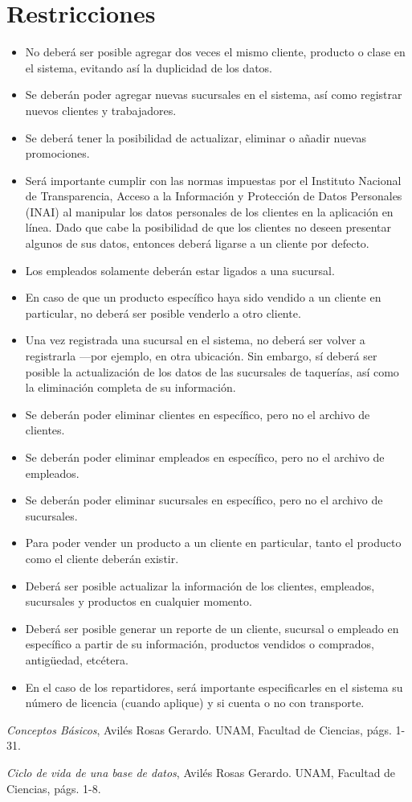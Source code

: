 \documentclass[11pt,letterpaper]{article}
\begin{document}
\section{Restricciones}
\begin{itemize}

\item No deberá ser posible agregar dos veces el mismo cliente, producto
o clase en el sistema, evitando así la duplicidad de los datos.
\item Se deberán poder agregar nuevas sucursales en el sistema, así como registrar nuevos clientes y trabajadores.
\item Se deberá tener la posibilidad de actualizar, eliminar o añadir nuevas promociones.
\item Será importante cumplir con las normas impuestas por el Instituto Nacional de Transparencia, Acceso a la Información y Protección de Datos Personales (INAI) al manipular los datos personales de los clientes en la aplicación en línea. Dado que cabe la posibilidad de que los clientes no deseen presentar algunos de sus datos, entonces deberá ligarse a un cliente por defecto.
\item Los empleados solamente deberán estar ligados a una sucursal.
\item En caso de que un producto específico haya sido vendido a un cliente en particular, no deberá ser posible venderlo a otro cliente.
\item Una vez registrada una sucursal en el sistema, no deberá ser volver a registrarla ---por ejemplo, en otra ubicación. Sin embargo, sí deberá ser posible la actualización de los datos de las sucursales de taquerías, así como la eliminación completa de su información.
\item Se deberán poder eliminar clientes en específico, pero no el archivo
de clientes.
\item Se deberán poder eliminar empleados en específico, pero no el archivo
de empleados.
\item Se deberán poder eliminar sucursales en específico, pero no el archivo
de sucursales.
\item Para poder vender un producto a un cliente en particular, tanto el producto como el cliente deberán existir.
\item Deberá ser posible actualizar la información de los clientes, empleados, sucursales
y productos en cualquier momento.
\item Deberá ser posible generar un reporte de un cliente, sucursal o empleado en específico
a partir de su información, productos vendidos o comprados, antigüedad, etcétera.
\item En el caso de los repartidores, será importante especificarles en el sistema su número de licencia (cuando aplique) y si cuenta o no con transporte.

\end{itemize}
 \begin{thebibliography}{1}


   \textit{Conceptos Básicos}, Avilés Rosas Gerardo. UNAM, Facultad de Ciencias,
págs. 1-31.

   \textit{Ciclo de vida de una base de datos}, Avilés Rosas Gerardo. UNAM, Facultad de Ciencias,
págs. 1-8.

  \end{thebibliography}
\end{document}
